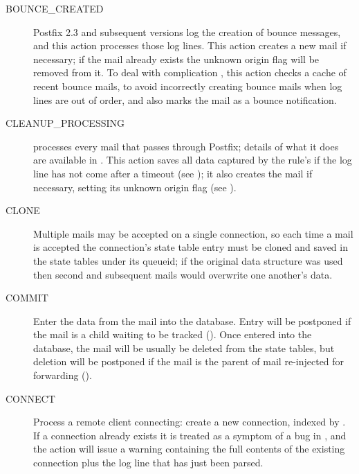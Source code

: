 \begin{description}

    \item [BOUNCE\_CREATED] Postfix 2.3 and subsequent versions log the
        creation of bounce messages, and this action processes those log
        lines.  This action creates a new mail if necessary; if the mail
        already exists the unknown origin flag will be removed from it.  To
        deal with complication , this action checks a
        cache of recent bounce mails, to avoid incorrectly creating bounce
        mails when log lines are out of order, and also marks the mail as a
        bounce notification.

    \item [CLEANUP\_PROCESSING]  processes every mail that
        passes through Postfix; details of what it does are available in
        .  This action saves all data captured
        by the rule's  if the log line has not come after a
        timeout (see ); it also
        creates the mail if necessary, setting its unknown origin flag (see
        ).

    \item [CLONE] Multiple mails may be accepted on a single connection, so
        each time a mail is accepted the connection's state table entry
        must be cloned and saved in the state tables under its queueid; if
        the original data structure was used then second and subsequent
        mails would overwrite one another's data.

    \item [COMMIT] Enter the data from the mail into the database.  Entry
        will be postponed if the mail is a child waiting to be tracked
        ().  Once entered into the database,
        the mail will be usually be deleted from the state tables, but
        deletion will be postponed if the mail is the parent of mail
        re-injected for forwarding ().

    \item [CONNECT] Process a remote client connecting: create a new
        connection, indexed by  .  If a
        connection already exists it is treated as a symptom of a bug in
        \parsername{}, and the action will issue a warning containing the
        full contents of the existing connection plus the log line that has
        just been parsed.


\end{description}
